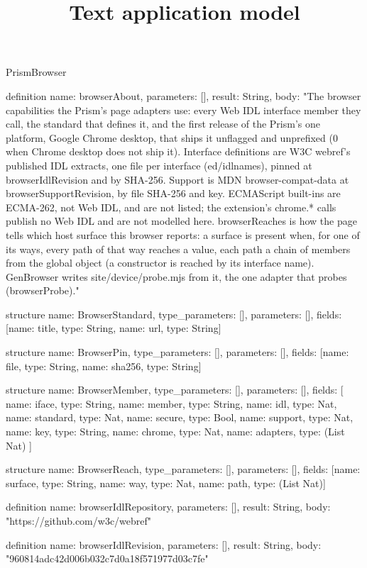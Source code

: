 \begin{lexlean}{PrismBrowser}
\title{Text application model}
\begin{semanticmodule}
definition{
  name: browserAbout,
  parameters: [],
  result: String,
  body: "The browser capabilities the Prism's page adapters use: every Web IDL interface member they call, the standard that defines it, and the first release of the Prism's one platform, Google Chrome desktop, that ships it unflagged and unprefixed (0 when Chrome desktop does not ship it). Interface definitions are W3C webref's published IDL extracts, one file per interface (ed/idlnames), pinned at browserIdlRevision and by SHA-256. Support is MDN browser-compat-data at browserSupportRevision, by file SHA-256 and key. ECMAScript built-ins are ECMA-262, not Web IDL, and are not listed; the extension's chrome.* calls publish no Web IDL and are not modelled here. browserReaches is how the page tells which host surface this browser reports: a surface is present when, for one of its ways, every path of that way reaches a value, each path a chain of members from the global object (a constructor is reached by its interface name). GenBrowser writes site/device/probe.mjs from it, the one adapter that probes (browserProbe)."
}

structure{
  name: BrowserStandard,
  type_parameters: [],
  parameters: [],
  fields: [{name: title, type: String}, {name: url, type: String}]
}

structure{
  name: BrowserPin,
  type_parameters: [],
  parameters: [],
  fields: [{name: file, type: String}, {name: sha256, type: String}]
}

structure{
  name: BrowserMember,
  type_parameters: [],
  parameters: [],
  fields: [
    {name: iface, type: String},
    {name: member, type: String},
    {name: idl, type: Nat},
    {name: standard, type: Nat},
    {name: secure, type: Bool},
    {name: support, type: Nat},
    {name: key, type: String},
    {name: chrome, type: Nat},
    {name: adapters, type: (List Nat)}
  ]
}

structure{
  name: BrowserReach,
  type_parameters: [],
  parameters: [],
  fields: [{name: surface, type: String}, {name: way, type: Nat}, {name: path, type: (List Nat)}]
}

definition{
  name: browserIdlRepository,
  parameters: [],
  result: String,
  body: "https://github.com/w3c/webref"
}

definition{
  name: browserIdlRevision,
  parameters: [],
  result: String,
  body: "960814adc42d006b032c7d0a18f571977d03c7fe"
}


\end{semanticmodule}
\end{lexlean}
